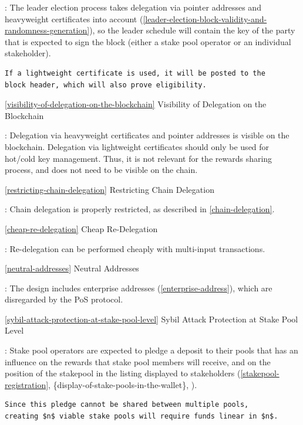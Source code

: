 \documentclass[11pt,a4paper]{article}
\begin{document}
: The leader election process takes delegation via pointer addresses and
heavyweight certificates into account
(\ref{leader-election-block-validity-and-randomness-generation}), so the
leader schedule will contain the key of the party that is expected to
sign the block (either a stake pool operator or an individual
stakeholder).

\begin{verbatim}
If a lightweight certificate is used, it will be posted to the
block header, which will also prove eligibility.
\end{verbatim}

\ref{visibility-of-delegation-on-the-blockchain} Visibility of
Delegation on the Blockchain

: Delegation via heavyweight certificates and pointer addresses is
visible on the blockchain. Delegation via lightweight certificates
should only be used for hot/cold key management. Thus, it is not
relevant for the rewards sharing process, and does not need to be
visible on the chain.

\ref{restricting-chain-delegation} Restricting Chain Delegation

: Chain delegation is properly restricted, as described in
\ref{chain-delegation}.

\ref{cheap-re-delegation} Cheap Re-Delegation

: Re-delegation can be performed cheaply with multi-input transactions.

\ref{neutral-addresses} Neutral Addresses

: The design includes enterprise addresses (\ref{enterprise-address}),
which are disregarded by the PoS protocol.

\ref{sybil-attack-protection-at-stake-pool-level} Sybil Attack
Protection at Stake Pool Level

: Stake pool operators are expected to pledge a deposit to their pools
that has an influence on the rewards that stake pool members will
receive, and on the position of the stakepool in the listing displayed
to stakeholders (\ref{stakepool-registration},
\{display-of-stake-pools-in-the-wallet\}, ).

\begin{verbatim}
Since this pledge cannot be shared between multiple pools,
creating $n$ viable stake pools will require funds linear in $n$.
\end{verbatim}
\end{document}
